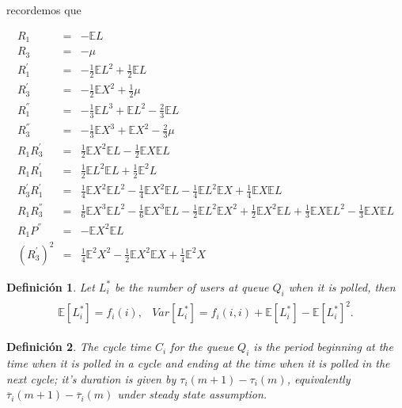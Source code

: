 \documentclass{article}
\newtheorem{Def}{Definición}
\newcommand{\esp}{\mathbb{E}}
\begin{document}
recordemos que


\begin{eqnarray*}
R_{1}&=&-\esp L\\
R_{3}&=& -\mu\\
R_{1}^{'}&=&-\frac{1}{2}\esp L^{2}+\frac{1}{2}\esp L\\
R_{3}^{'}&=&-\frac{1}{2}\esp X^{2}+\frac{1}{2}\mu\\
R_{1}^{''}&=&-\frac{1}{3}\esp L^{3}+\esp L^{2}-\frac{2}{3}\esp L\\
R_{3}^{''}&=&-\frac{1}{3}\esp X^{3}+\esp X^{2}-\frac{2}{3}\mu\\
R_{1}R_{3}^{'}&=&\frac{1}{2}\esp X^{2}\esp L-\frac{1}{2}\esp X\esp L\\
R_{1}R_{1}^{'}&=&\frac{1}{2}\esp L^{2}\esp L+\frac{1}{2}\esp^{2}L\\
R_{3}^{'}R_{1}^{'}&=&\frac{1}{4}\esp X^{2}\esp L^{2}-\frac{1}{4}\esp X^{2}\esp L-\frac{1}{4}\esp L^{2}\esp X+\frac{1}{4}\esp X\esp L\\
R_{1}R_{3}^{''}&=&\frac{1}{6}\esp X^{3}\esp L^{2}-\frac{1}{6}\esp X^{3}\esp L-\frac{1}{2}\esp L^{2}\esp X^{2}+\frac{1}{2}\esp X^{2}\esp L+\frac{1}{3}\esp X\esp L^{2}-\frac{1}{3}\esp X\esp L\\
R_{1}P^{''}&=&-\esp X^{2}\esp L\\
\left(R_{3}^{'}\right)^{2}&=&\frac{1}{4}\esp^{2}X^{2}-\frac{1}{2}\esp X^{2}\esp X+\frac{1}{4}\esp^{2} X
\end{eqnarray*}




\begin{Def}
Let $L_{i}^{*}$ be the number of users at queue $Q_{i}$ when it is polled, then
\begin{eqnarray}
\begin{array}{cc}
\esp\left[L_{i}^{*}\right]=f_{i}\left(i\right), &
Var\left[L_{i}^{*}\right]=f_{i}\left(i,i\right)+\esp\left[L_{i}^{*}\right]-\esp\left[L_{i}^{*}\right]^{2}.
\end{array}
\end{eqnarray}
\end{Def}

\begin{Def}
The cycle time $C_{i}$ for the queue $Q_{i}$ is the period beginning at the time when it is polled in a cycle and ending at the time when it is polled in the next cycle; it's duration is given by $\tau_{i}\left(m+1\right)-\tau_{i}\left(m\right)$, equivalently $\overline{\tau}_{i}\left(m+1\right)-\overline{\tau}_{i}\left(m\right)$ under steady state assumption.
\end{Def}
\end{document}
